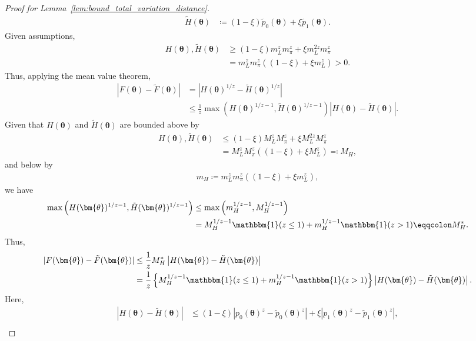 \documentclass[12pt]{article}
\begin{document}
\begin{proof}[Proof for Lemma~\ref{lem:bound_total_variation_distance}]
\begin{align*}
        \tilde{H}(\bm{\theta}) &\coloneqq(1 - \xi) \tilde{p}_0(\bm{\theta}) + \xi \tilde{p}_1(\bm{\theta}).
    \end{align*}
    Given assumptions,
    \begin{align*}
        H(\bm{\theta}), \tilde{H}(\bm{\theta}) &\geq (1 - \xi)m_L^z m_\pi^z + \xi m_L^{2z}m_\pi^z \\
        &= m_L^z m_\pi^z((1 - \xi) + \xi m_L^z) > 0.
    \end{align*}
    Thus, applying the mean value theorem,
    \begin{align*}
        |F(\bm{\theta}) - \tilde{F}(\bm{\theta})| &= \left|H(\bm{\theta})^{1 / z} - \tilde{H}(\bm{\theta})^{1 / z} \right| \\
        &\leq \frac{1}{z}\max\left(H(\bm{\theta})^{1/z - 1}, \tilde{H}(\bm{\theta})^{1/z - 1}\right)|H(\bm{\theta}) - \tilde{H}(\bm{\theta})|.
    \end{align*}
    Given that $H(\bm{\theta})$ and $\tilde{H}(\bm{\theta})$ are bounded above by
    \begin{align*}
        H(\bm{\theta}), \tilde{H}(\bm{\theta}) &\leq (1 - \xi) M_L^z M_\pi^z + \xi M_L^{2z}M_\pi^z \\
        &= M_L^z M_\pi^z \left((1 - \xi) + \xi M_L^z \right) \eqqcolon M_H,
    \end{align*}
    and below by
    \begin{align*}
        m_H \coloneqq m_L^z m_\pi^z((1 - \xi) + \xi m_L^z),
    \end{align*}
    we have
    \begin{align*}
        \max\left(H(\bm{\theta})^{1/z - 1}, \tilde{H}(\bm{\theta})^{1/z - 1}\right) &\leq \max\left(m_H^{1/z - 1}, M_H^{1/z - 1}\right) \\
        &= M_H^{1/z - 1} \mathbbm{1}(z \leq 1) + m_H^{1/z - 1}\mathbbm{1}(z > 1) \eqqcolon M^*_H.
    \end{align*}
    Thus,
    \begin{align*}
        |F(\bm{\theta}) - \tilde{F}(\bm{\theta})| &\leq \frac{1}{z} M_H^* \left|H(\bm{\theta}) - \tilde{H}(\bm{\theta})\right| \\
        &= \frac{1}{z}\left\{M_H^{1/z - 1} \mathbbm{1}(z \leq 1) + m_H^{1/z - 1}\mathbbm{1}(z > 1)\right\} \left|H(\bm{\theta}) - \tilde{H}(\bm{\theta})\right|.
    \end{align*}
    Here,
    \begin{align*}
        \left|H(\bm{\theta}) - \tilde{H}(\bm{\theta})\right| &\leq (1 - \xi) \left| p_0(\bm{\theta})^z - \tilde{p}_0(\bm{\theta})^z \right| + \xi \left| p_1(\bm{\theta})^z - \tilde{p}_1(\bm{\theta})^z \right|, \\

\end{align*}
\end{proof}
\end{document}

